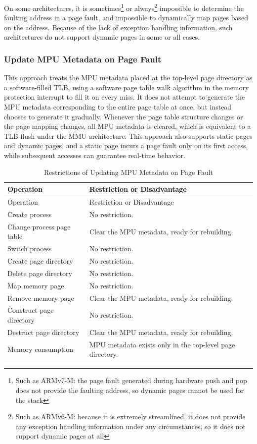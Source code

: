 On some architectures, it is sometimes\footnote{Such as ARMv7-M: the page fault generated during hardware push and pop does not provide the faulting address, so dynamic pages cannot be used for the stack} or always\footnote{Such as ARMv6-M: because it is extremely streamlined, it does not provide any exception handling information under any circumstances, so it does not support dynamic pages at all} impossible to determine the faulting address in a page fault, and impossible to dynamically map pages based on the address. Because of the lack of exception handling information, such architectures do not support dynamic pages in some or all cases.

\subsubsection{Update MPU Metadata on Page Fault}\label{subsubsec:3-update-mpu-metadata-on-page-fault}

This approach treats the MPU metadata placed at the top-level page directory as a software-filled TLB, using a software page table walk algorithm in the memory protection interrupt to fill it on every miss. It does not attempt to generate the MPU metadata corresponding to the entire page table at once, but instead chooses to generate it gradually. Whenever the page table structure changes or the page mapping changes, all MPU metadata is cleared, which is equivalent to a TLB flush under the MMU architecture. This approach also supports static pages and dynamic pages, and a static page incurs a page fault only on its first access, while subsequent accesses can guarantee real-time behavior.

\begin{xltabular}{\textwidth}{@{}>{\hsize\raggedright\arraybackslash}X>{\hsize\raggedright\arraybackslash}X@{}}
\caption{Restrictions of Updating MPU Metadata on Page Fault}\label{tab:3-7-page-fault-mpu-metadata-update-constraints}\\
\toprule
Operation & Restriction or Disadvantage\tabularnewline
\endfirsthead
\toprule
Operation & Restriction or Disadvantage\tabularnewline
\midrule
\endhead
\bottomrule
\endlastfoot
Create process & No restriction.\tabularnewline
Change process page table & Clear the MPU metadata, ready for rebuilding.\tabularnewline
Switch process & No restriction.\tabularnewline
Create page directory & No restriction.\tabularnewline
Delete page directory & No restriction.\tabularnewline
Map memory page & No restriction.\tabularnewline
Remove memory page & Clear the MPU metadata, ready for rebuilding.\tabularnewline
Construct page directory & No restriction.\tabularnewline
Destruct page directory & Clear the MPU metadata, ready for rebuilding.\tabularnewline
Memory consumption & MPU metadata exists only in the top-level page directory.\tabularnewline
\end{xltabular}
\nopagebreak[4]

